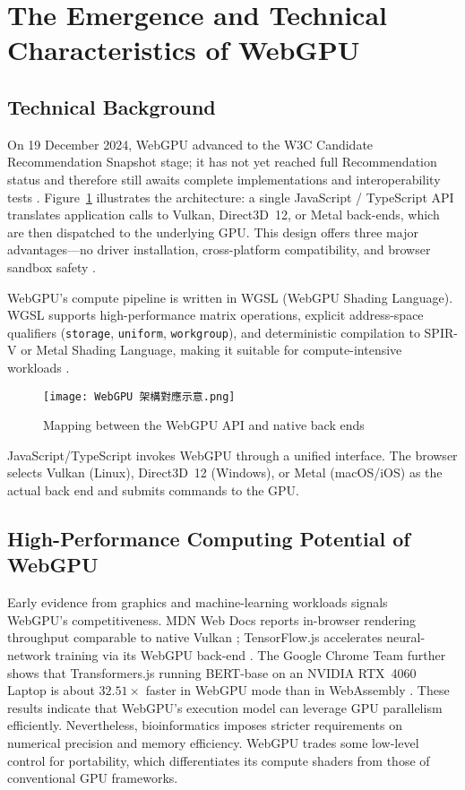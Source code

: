 \documentclass[PhD]{PHlab-thesis}
\begin{document}
\section{The Emergence and Technical Characteristics of WebGPU}

\subsection{Technical Background}
On 19 December 2024, WebGPU advanced to the W3C Candidate Recommendation Snapshot stage; it has not yet reached full Recommendation status and therefore still awaits complete implementations and interoperability tests \cite{W3C2024-webgpu}. Figure~\ref{fig:webgpu-mapping} illustrates the architecture: a single JavaScript / TypeScript API translates application calls to Vulkan, Direct3D~12, or Metal back-ends, which are then dispatched to the underlying GPU. This design offers three major advantages—no driver installation, cross-platform compatibility, and browser sandbox safety \cite{Chrome2024-blog}.

WebGPU's compute pipeline is written in WGSL (WebGPU Shading Language). WGSL supports high-performance matrix operations, explicit address-space qualifiers (\verb|storage|, \verb|uniform|, \verb|workgroup|), and deterministic compilation to SPIR-V or Metal Shading Language, making it suitable for compute-intensive workloads \cite{W3C2024-webgpu}.

\begin{figure}[htbp]
    \centering
    \texttt{[image: WebGPU 架構對應示意.png]}
    \caption{Mapping between the WebGPU API and native back ends}
    \label{fig:webgpu-mapping}
\end{figure}

JavaScript/TypeScript invokes WebGPU through a unified interface. The browser selects Vulkan (Linux), Direct3D~12 (Windows), or Metal (macOS/iOS) as the actual back end and submits commands to the GPU.

\subsection{High-Performance Computing Potential of WebGPU}
Early evidence from graphics and machine-learning workloads signals \\ WebGPU's competitiveness. MDN Web Docs reports in-browser rendering throughput comparable to native Vulkan \cite{MDN2025-webgpuapi}; TensorFlow.js accelerates neural-network training via its WebGPU back-end \cite{TensorFlowJS2024-webgpu}. The Google Chrome Team further shows that Transformers.js running BERT-base on an NVIDIA RTX~4060 Laptop is about $32.51\times$ faster in WebGPU mode than in WebAssembly \cite{ChromeTeam2024-recap}. These results indicate that WebGPU's execution model can leverage GPU parallelism efficiently.  
Nevertheless, bioinformatics imposes stricter requirements on numerical precision and memory efficiency. WebGPU trades some low-level control for portability, which differentiates its compute shaders from those of conventional GPU frameworks.
\end{document}
